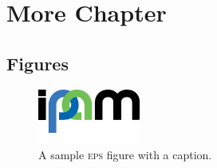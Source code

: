 \chapter{More Chapter}\label{Ch:figures}




\section{Figures}

\begin{figure}[ht]
\begin{center}
\includegraphics[width=0.3\textwidth]{Graphics/ipamlogo.eps}
\end{center}
\caption{A sample \textsc{eps} figure with a caption.}\label{FIGURE:IPAM-logo-eps}
\end{figure} 


